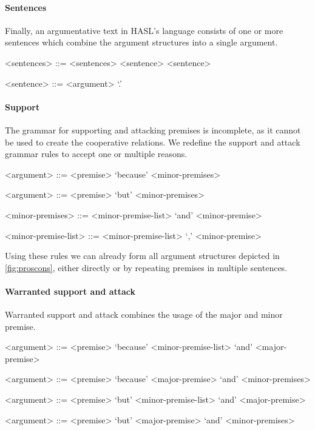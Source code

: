 \paragraph{Sentences} Finally, an argumentative text in HASL's language consists of one or more sentences which combine the argument structures into a single argument.

\begin{grammar}
<sentences> ::= <sentences> <sentence>
    \alt <sentence>

<sentence> ::= <argument> `.'
\end{grammar}

\paragraph{Support} The grammar for supporting and attacking premises is incomplete, as it cannot be used to create the cooperative relations. We redefine the support and attack grammar rules to accept one or multiple reasons.

\begin{grammar}
<argument> ::= <premise> `because' <minor-premises> %

<argument> ::= <premise> `but' <minor-premises> %

<minor-premises> ::= <minor-premise-list> `and' <minor-premise>

<minor-premise-list> ::= <minor-premise-list> `,' <minor-premise>
\end{grammar}

\noindent Using these rules we can already form all argument structures depicted in \autoref{fig:proscons}, either directly or by repeating premises in multiple sentences.

\paragraph{Warranted support and attack} Warranted support and attack combines the usage of the major and minor premise.

\begin{grammar}
<argument> ::= <premise> `because' <minor-premise-list> `and' <major-premise> %

<argument> ::= <premise> `because' <major-premise> `and' <minor-premises> %

<argument> ::= <premise> `but' <minor-premise-list> `and' <major-premise> %

<argument> ::= <premise> `but' <major-premise> `and' <minor-premises> %
\end{grammar}


